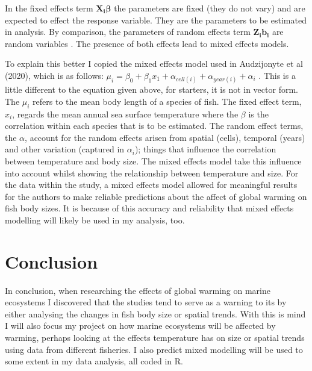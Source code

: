 \documentclass{article}
\begin{document}
In the fixed effects term $\mathbf{X_i {\boldsymbol\beta}}$ the parameters are fixed (they do not vary) and are expected to effect the response variable. They are the parameters to be estimated in analysis. By comparison, the parameters of random effects term $\mathbf{Z_i b_i}$ are random variables \cites{14, 15}. The presence of both effects lead to mixed effects models. 

To explain this better I copied the mixed effects model used in Audzijonyte et al (2020), which is as follows: $\mu_i = \beta_0 + \beta_1 x_1 + \alpha_{cell(i)} + \alpha_{year(i)} + \alpha_i$ . This is a little different to the equation given above, for starters, it is not in vector form. The $\mu_i$ refers to the mean body length of a species of fish. The fixed effect term, $x_i$, regards the mean annual sea surface temperature where the $\beta$ is the correlation within each species that is to be estimated. The random effect terms, the $\alpha$, account for the random effects arisen from spatial (cells), temporal (years) and other variation (captured in $\alpha_i$);  things that influence the correlation between temperature and body size. The mixed effects model take this influence into account whilst showing the relationship between temperature and size. For the data within the study, a mixed effects model allowed for meaningful results for the authors to make reliable predictions about the affect of global warming on fish body sizes. It is because of this accuracy and reliability that mixed effects modelling will likely be used in my analysis, too.

\section{Conclusion}

In conclusion, when researching the effects of global warming on marine ecosystems I discovered that the studies tend to serve as a warning to its by either analysing the changes in fish body size or spatial trends. With this is mind I will also focus my project on how marine ecosystems will be affected by warming, perhaps looking at the effects temperature has on size or spatial trends using data from different fisheries. I also predict mixed modelling will be used to some extent in my data analysis, all coded in R.
\end{document}
